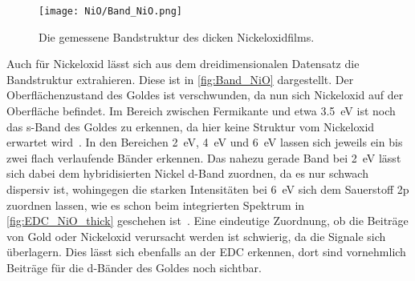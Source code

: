         \begin{figure}
            \centering
            \texttt{[image: NiO/Band\_NiO.png]}
            \caption{Die gemessene Bandstruktur des dicken Nickeloxidfilms.}
            \label{fig:Band_NiO}
        \end{figure}
        Auch für Nickeloxid lässt sich aus dem dreidimensionalen Datensatz die Bandstruktur extrahieren.
        Diese ist in \autoref{fig:Band_NiO} dargestellt. %
        Der Oberflächenzustand des Goldes ist verschwunden, da nun sich Nickeloxid auf der Oberfläche befindet.
        Im Bereich zwischen Fermikante und etwa \SI{3.5}{\electronvolt} ist noch das s-Band des Goldes zu erkennen, da hier keine Struktur vom Nickeloxid erwartet wird~\cite{NiO_12}.
        In den Bereichen \SI{2}{\electronvolt}, \SI{4}{\electronvolt} und \SI{6}{\electronvolt} lassen sich jeweils ein bis zwei flach verlaufende Bänder erkennen.
        Das nahezu gerade Band bei \SI{2}{\electronvolt} lässt sich dabei dem hybridisierten Nickel d-Band zuordnen, da es nur schwach dispersiv ist, wohingegen die starken Intensitäten bei \SI{6}{\electronvolt} sich dem Sauerstoff 2p zuordnen lassen, wie es schon beim integrierten Spektrum in \autoref{fig:EDC_NiO_thick} geschehen ist~\cite{Hüfner}.
        Eine eindeutige Zuordnung, ob die Beiträge von Gold oder Nickeloxid verursacht werden ist schwierig, da die Signale sich überlagern. %
        Dies lässt sich ebenfalls an der EDC erkennen, dort sind vornehmlich Beiträge für die d-Bänder des Goldes noch sichtbar.
        
    \FloatBarrier
